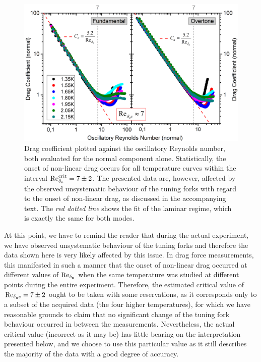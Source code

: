 \begin{figure}[h!]
	\centering
	\includegraphics[width=1\textwidth]{graphs/Merged_Cn_Ren}
	\caption{Drag coefficient plotted against the oscillatory Reynolds number, both evaluated for the normal component alone. Statistically, the onset of non-linear drag occurs for all temperature curves within the interval $ \text{Re}_{\delta_{\mathrm{n}}}^{\mathrm{crit}}=7\pm 2 $. The presented data are, however, affected by the observed unsystematic behaviour of the tuning forks with regard to the onset of non-linear drag, as discussed in the accompanying text. The \textit{red dotted line} shows the fit of the laminar regime, which is exactly the same for both modes.}
\end{figure}

At this point, we have to remind the reader that during the actual experiment, we have observed unsystematic behaviour of the tuning forks and therefore the data shown here is very likely affected by this issue. In drag force measurements, this manifested in such a manner that the onset of non-linear drag occurred at different values of $ \text{Re}_{\delta_{\mathrm{n}}} $ when the same temperature was studied at different points during the entire experiment. Therefore, the estimated critical value of $ \text{Re}_{\delta_{\mathrm{n}}c}=7\pm 2 $ ought to be taken with some reservations, as it corresponds only to a subset of the acquired data (the four higher temperatures), for which we have reasonable grounds to claim that no significant change of the tuning fork behaviour occurred in between the measurements. Nevertheless, the actual critical value (incorrect as it may be) has little bearing on the interpretation presented below, and we choose to use this particular value as it still describes the majority of the data with a good degree of accuracy.

